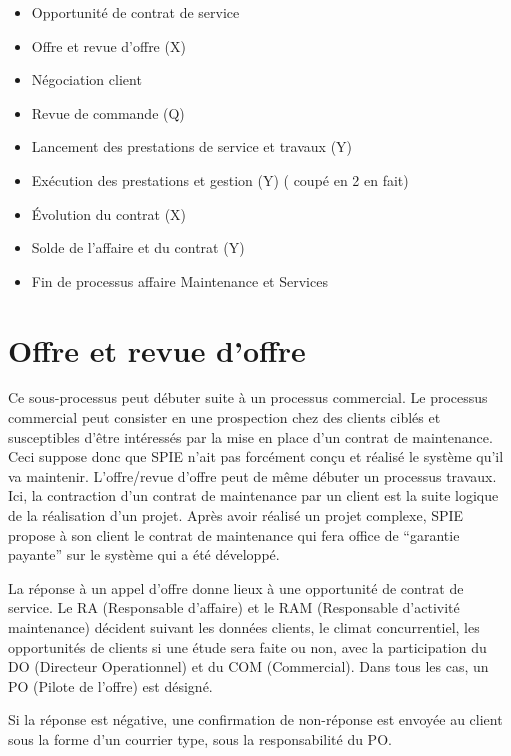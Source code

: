 
\begin{itemize}
\item Opportunité de contrat de service
\item Offre et revue d’offre (X)
\item Négociation client 
\item Revue de commande (Q)
\item Lancement des prestations de service et travaux (Y)
\item Exécution des prestations et gestion (Y) ( coupé en 2 en fait)
\item Évolution du contrat (X)
\item Solde de l’affaire et du contrat (Y)
\item Fin de processus affaire Maintenance et Services
\end{itemize}

\section{Offre et revue d’offre}

Ce sous-processus peut débuter suite à un processus commercial. Le processus commercial peut consister en une prospection chez des clients ciblés et susceptibles d’être intéressés par la mise en place d’un contrat de maintenance. Ceci suppose donc que SPIE n’ait pas forcément conçu et réalisé le système qu’il va maintenir. L’offre/revue d’offre peut de même débuter  un processus travaux. Ici, la contraction d’un contrat de maintenance par un client est la suite logique de la réalisation d’un projet. Après avoir réalisé un projet complexe, SPIE propose à son client le contrat de maintenance qui fera office de “garantie payante” sur le système qui a été développé.

La réponse à un appel d’offre donne lieux à une opportunité de contrat de service. Le RA (Responsable d’affaire) et le RAM (Responsable d’activité maintenance) décident suivant les données clients, le climat concurrentiel, les opportunités de clients si une étude sera faite ou non, avec la participation du DO (Directeur Operationnel) et du COM (Commercial). Dans tous les cas, un PO (Pilote de l’offre) est désigné.

Si la réponse est négative, une confirmation de non-réponse est envoyée au client sous la forme d’un courrier type, sous la responsabilité du PO.

